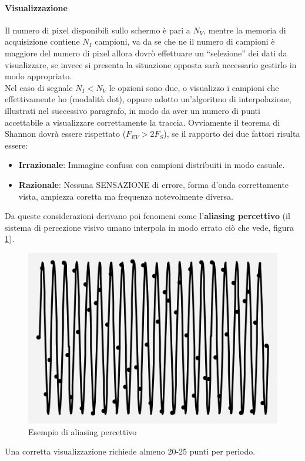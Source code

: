 \documentclass[12pt]{article}
\begin{document}
\paragraph{Visualizzazione} Il numero di pixel disponibili sullo schermo è pari a $N_{V}$, mentre la memoria di acquisizione contiene $N_{I}$ campioni, va da se che ne il numero di campioni è maggiore del numero di pixel allora dovrò effettuare un ``selezione'' dei dati da visualizzare, se invece si presenta la situazione opposta sarà necessario gestirlo in modo appropriato.\\
Nel caso di segnale $N_{I}<N_{V}$ le opzioni sono due, o visualizzo i campioni che effettivamente ho (modalità dot), oppure adotto un'algoritmo di interpolazione, illustrati nel successivo paragrafo, in modo da aver un numero di punti accettabile a visualizzare correttamente la traccia. Ovviamente il teorema di Shannon dovrà essere rispettato ($F_{EV}>2F_{S}$), se il rapporto dei due fattori risulta essere:
\begin{itemize}
  \item \textbf{Irrazionale}: Immagine confusa con campioni distribuiti in modo casuale.
  \item \textbf{Razionale}: Nessuna SENSAZIONE di errore, forma d'onda correttamente vista, ampiezza coretta ma frequenza notevolmente diversa.
\end{itemize}
Da queste considerazioni derivano poi fenomeni come l'\textbf{aliasing percettivo} (il sistema di percezione visivo umano interpola in modo errato ciò che vede, figura \ref{fig:alias_perc}).

\begin{figure}[!hpt]
  \includegraphics[width=\textwidth]{images/alias_perc.png}
  \caption{Esempio di aliasing percettivo}
  \label{fig:alias_perc}
\end{figure}
Una corretta visualizzazione richiede almeno 20-25 punti per periodo.
\end{document}
